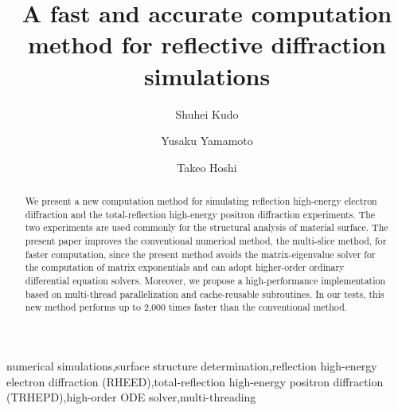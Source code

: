 \documentclass[preprint, 5p, times, sort&compress]{elsarticle}
\begin{document}
        \begin{frontmatter}
            \title{A fast and accurate computation method for reflective diffraction simulations}
            \author[uec]{Shuhei Kudo}
            \author[uec]{Yusaku Yamamoto}
            \author[tottori]{Takeo Hoshi}
            
            \begin{abstract}
                We present a new computation method for simulating
                reflection high-energy electron diffraction
                and the total-reflection high-energy positron diffraction experiments. The two experiments are used commonly for the structural analysis of material surface. 
                The present paper improves the conventional numerical method, the multi-slice method, for faster computation, since the present method avoids the matrix-eigenvalue solver for the computation of matrix exponentials and can adopt higher-order ordinary differential equation solvers. 
                Moreover, we propose a high-performance implementation based on multi-thread parallelization and cache-reusable subroutines.
                In our tests, this new method performs up to 2,000 times faster than the conventional method.
            \end{abstract}            
            \begin{keyword}
            numerical simulations\sep surface structure determination\sep reflection high-energy electron diffraction (RHEED)\sep total-reflection high-energy positron diffraction (TRHEPD)\sep high-order ODE solver\sep multi-threading
            \end{keyword}
        \end{frontmatter}
\end{document}

